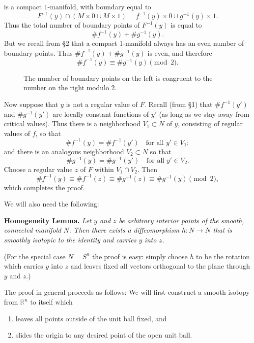 
is a compact $1$-manifold, with boundary equal to
\[
F^{-1}(y) \cap (M \times 0 \cup M \times 1) = f^{-1}(y) \times 0 \cup g^{-1}(y) \times 1.
\]
Thus the total number of boundary points of $F^{-1}(y)$ is equal to
\[
\#f^{-1}(y) + \#g^{-1}(y).
\]
But we recall from §2 that a compact $1$-manifold always has an even number of boundary points. Thus $\#f^{-1}(y) + \#g^{-1}(y)$ is even, and therefore
\[
\#f^{-1}(y) \equiv \#g^{-1}(y) \pmod{2}.
\]

\begin{figure}[htbp]
\centering
\setcounter{figure}{5}%
\caption{The number of boundary points on the left is congruent to the number on the right modulo $2$.}\label{fig:milnor-06}
\end{figure}

Now suppose that $y$ is not a regular value of $F$. Recall (from §1) that $\#f^{-1}(y')$ and $\#g^{-1}(y')$ are locally constant functions of $y'$ (as long as we stay away from critical values). Thus there is a neighborhood $V_1 \subset N$ of $y$, consisting of regular values of $f$, so that
\[
\#f^{-1}(y) = \#f^{-1}(y') \quad \text{for all } y' \in V_1;
\]
and there is an analogous neighborhood $V_2 \subset N$ so that
\[
\#g^{-1}(y) = \#g^{-1}(y') \quad \text{for all } y' \in V_2.
\]
Choose a regular value $z$ of $F$ within $V_1 \cap V_2$. Then
\[
\#f^{-1}(y) \equiv \#f^{-1}(z) \equiv \#g^{-1}(z) \equiv \#g^{-1}(y) \pmod{2},
\]
which completes the proof.

We will also need the following:

\noindent\textbf{Homogeneity Lemma.} \textit{Let $y$ and $z$ be arbitrary interior points of the smooth, connected manifold $N$. Then there exists a diffeomorphism $h: N \to N$ that is smoothly isotopic to the identity and carries $y$ into $z$.}



(For the special case $N = S^n$ the proof is easy: simply choose $h$ to be the rotation which carries $y$ into $z$ and leaves fixed all vectors orthogonal to the plane through $y$ and $z$.)

The proof in general proceeds as follows: We will first construct a smooth isotopy from $\mathbb{R}^n$ to itself which
\begin{enumerate}
\item leaves all points outside of the unit ball fixed, and
\item slides the origin to any desired point of the open unit ball.
\end{enumerate}

